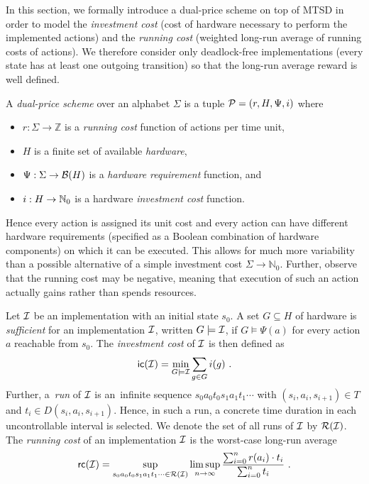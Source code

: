 In this section, we formally introduce a dual-price scheme on top of 
MTSD in order to model the \emph{investment cost} (cost of hardware necessary to 
perform the implemented actions) and the \emph{running cost} (weighted 
long-run average of running costs of actions).
We therefore consider only deadlock-free implementations 
(every state has at least one outgoing transition) so that the long-run
average reward is well defined.  

\begin{definition} 
A \emph{dual-price scheme} over an alphabet $\Sigma$ is 
a tuple $\mathcal P=(r,H,\Psi,i)$ where 
\begin{itemize}
 \item $r:\Sigma\to\mathbb Z$ is a \emph{running cost} function of actions per
 time unit,
 \item $H$ is a finite set of available \emph{hardware},
 \item $\Psi:\Sigma\to\mathcal B(H)$ is a \emph{hardware requirement} function, and
 \item $i:H\to\mathbb N_0$ is a hardware \emph{investment cost} function.
\end{itemize}
\end{definition}

Hence every action is assigned its unit cost and every action
can have different hardware requirements (specified as a Boolean
combination of hardware components) on which it can be executed.
This allows for much more variability than a possible alternative of a simple investment cost $\Sigma\to \mathbb N_0$. Further, observe that the running cost may be negative, meaning that execution of such an action actually gains 
rather than spends resources. 
 
Let $\mathcal I$ be an implementation with an initial state $s_0$.
A set $G\subseteq H$ of hardware is \emph{sufficient} for an implementation
$\mathcal I$, written $G\models \mathcal I$, if $G\models\Psi(a)$ for every action $a$ reachable
from $s_0$.  The \emph{investment cost} of %
$\mathcal I$ is then defined as
\[\mathsf{ic}(\mathcal I)=\min_{G\models \mathcal I}\sum_{g\in G}i(g) \ . \]
Further, 
a~\emph{run} of $\mathcal I$ is an~infinite sequence $s_0 a_0 t_0 s_1 a_1 t_1 \cdots$ with
$(s_i, a_i, s_{i+1}) \in T$ and $t_i\in D(s_i, a_i, s_{i+1})$.
Hence, in such a run, a concrete time duration in each uncontrollable interval
is selected. We denote the set of all runs of $\mathcal I$ by $\mathcal
R(\mathcal I)$.  The \emph{running cost} of an implementation $\mathcal I$ is the worst-case
long-run average 
\[
	\rc(\Impl) = \sup_{s_0a_0t_0s_1a_1t_1 \cdots \in \mathcal R(\Impl)} 
		\limsup_{n \to \infty} 
		\frac{\sum_{i = 0}^{n} r(a_i)
			\cdot t_i}%
		{\sum_{i = 0}^{n} t_i}%
\ .
\]

